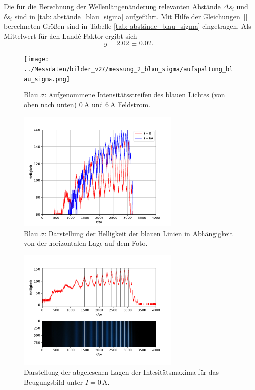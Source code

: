 Die für die Berechnung der Wellenlängenänderung relevanten Abstände $\Delta s_i$ und $\delta s_i$
sind in \autoref{tab: abstände_blau_sigma}
aufgeführt. Mit Hilfe der Gleichungen~\eqref{} berechneten Größen sind in Tabelle
\ref{tab: abstände_blau_sigma} eingetragen. Als Mittelwert für den Landé-Faktor ergibt sich
\begin{equation}
  g = \num{2.02(2)}.
\end{equation}
\begin{figure}
  \centering
  \texttt{[image: ../Messdaten/bilder\_v27/messung\_2\_blau\_sigma/aufspaltung\_blau\_sigma.png]}
  \caption{Blau $\sigma$: Aufgenommene Intensitätsstreifen des blauen Lichtes (von oben nach unten) $\SI{0}{\ampere}$ und $\SI{6}{\ampere}$ Feldstrom.}
  \label{fig: aufspaltung_blau_sigma}
\end{figure}
\begin{figure}
  \centering
  \includegraphics[width = 0.7\textwidth]{../Messdaten/plots/blau_sigma_intensitaet.pdf}
  \caption{Blau $\sigma$: Darstellung der Helligkeit der blauen Linien in Abhängigkeit von der horizontalen Lage auf dem Foto.}
  \label{fig: blau_intensität_sigma}
\end{figure}

\begin{figure}
  \centering
  \includegraphics[width = 0.7\textwidth]{../Messdaten/plots/peaks_blau_sigma_0.pdf}
  \caption{Darstellung der abgelesenen Lagen der Intesitätsmaxima für das Beugungsbild unter $I =\SI{0}{\ampere}$.}
  \label{fig: peaks_blau_0}
\end{figure}
